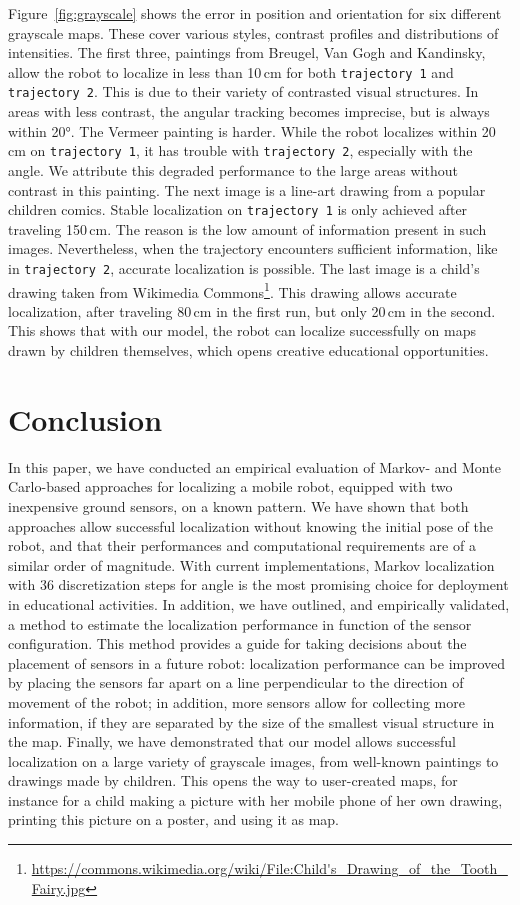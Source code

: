 \documentclass[letterpaper, 10pt, conference]{ieeeconf}
\newcommand{\Fig}[1]{Figure~\ref{fig:#1}}
\begin{document}
\Fig{grayscale} shows the error in position and orientation for six different grayscale maps.
These cover various styles, contrast profiles and distributions of intensities.
The first three, paintings from Breugel, Van Gogh and Kandinsky, allow the robot to localize in less than 10\,cm for both \texttt{trajectory~1} and \texttt{trajectory~2}.
This is due to their variety of contrasted visual structures.
In areas with less contrast, the angular tracking becomes imprecise, but is always within 20°.
The Vermeer painting is harder.
While the robot localizes within 20\,cm on \texttt{trajectory~1}, it has trouble with \texttt{trajectory~2}, especially with the angle.
We attribute this degraded performance to the large areas without contrast in this painting.
The next image is a line-art drawing from a popular children comics.
Stable localization on \texttt{trajectory~1} is only achieved after traveling 150\,cm.
The reason is the low amount of information present in such images.
Nevertheless, when the trajectory encounters sufficient information, like in \texttt{trajectory~2}, accurate localization is possible.
The last image is a child's drawing taken from Wikimedia Commons\footnote{\url{https://commons.wikimedia.org/wiki/File:Child's_Drawing_of_the_Tooth_Fairy.jpg}}.
This drawing allows accurate localization, after traveling 80\,cm in the first run, but only 20\,cm in the second.
This shows that with our model, the robot can localize successfully on maps drawn by children themselves, which opens creative educational opportunities.

\section{Conclusion}

In this paper, we have conducted an empirical evaluation of Markov- and Monte Carlo-based approaches for localizing a mobile robot, equipped with two inexpensive ground sensors, on a known pattern.
We have shown that both approaches allow successful localization without knowing the initial pose of the robot, and that their performances and computational requirements are of a similar order of magnitude.
With current implementations, Markov localization with 36 discretization steps for angle is the most promising choice for deployment in educational activities.
In addition, we have outlined, and empirically validated, a method to estimate the localization performance in function of the sensor configuration.
This method provides a guide for taking decisions about the placement of sensors in a future robot:
localization performance can be improved by placing the sensors far apart on a line perpendicular to the direction of movement of the robot; in addition, more sensors allow for collecting more information, if they are separated by the size of the smallest visual structure in the map.
Finally, we have demonstrated that our model allows successful localization on a large variety of grayscale images, from well-known paintings to drawings made by children.
This opens the way to user-created maps, for instance for a child making a picture with her mobile phone of her own drawing, printing this picture on a poster, and using it as map.
\end{document}
